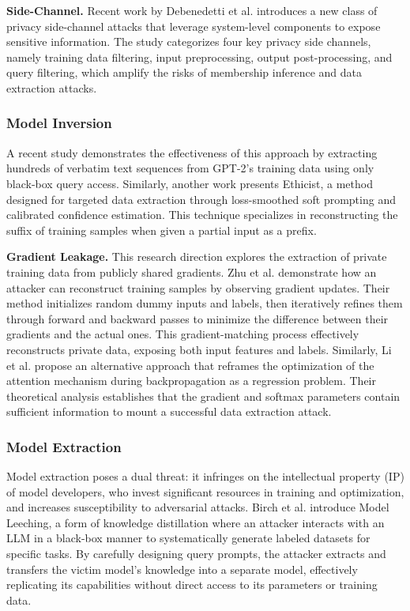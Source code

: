 \smallskip
\noindent
{\bf Side-Channel.} Recent work by Debenedetti et al. \cite{debenedetti2024privacychannels} introduces a new class of privacy side-channel attacks that leverage system-level components to expose sensitive information. The study categorizes four key privacy side channels, namely training data filtering, input preprocessing, output post-processing, and query filtering, which amplify the risks of membership inference and data extraction attacks.

\subsubsection{Model Inversion}

A recent study \cite{modelinversion1} demonstrates the effectiveness of this approach by extracting hundreds of verbatim text sequences from GPT-2’s training data using only black-box query access. Similarly, another work \cite{zhang2023trainingdata} presents Ethicist, a method designed for targeted data extraction through loss-smoothed soft prompting and calibrated confidence estimation. This technique specializes in reconstructing the suffix of training samples when given a partial input as a prefix.

\smallskip
\noindent
{\bf Gradient Leakage.} This research direction explores the extraction of private training data from publicly shared gradients. Zhu et al. \cite{zhu2019deepleakagegradients} demonstrate how an attacker can reconstruct training samples by observing gradient updates. Their method initializes random dummy inputs and labels, then iteratively refines them through forward and backward passes to minimize the difference between their gradients and the actual ones. This gradient-matching process effectively reconstructs private data, exposing both input features and labels. Similarly, Li et al. \cite{li2023} propose an alternative approach that reframes the optimization of the attention mechanism during backpropagation as a regression problem. Their theoretical analysis establishes that the gradient and softmax parameters contain sufficient information to mount a successful data extraction attack.

\subsubsection{Model Extraction}

Model extraction poses a dual threat: it infringes on the intellectual property (IP) of model developers, who invest significant resources in training and optimization, and increases susceptibility to adversarial attacks. Birch et al. \cite{birch_2023a} introduce Model Leeching, a form of knowledge distillation where an attacker interacts with an LLM in a black-box manner to systematically generate labeled datasets for specific tasks. By carefully designing query prompts, the attacker extracts and transfers the victim model’s knowledge into a separate model, effectively replicating its capabilities without direct access to its parameters or training data. 

